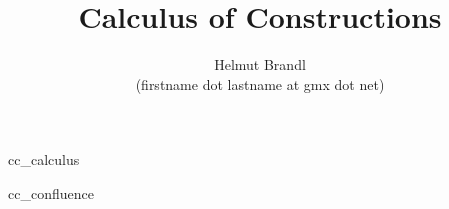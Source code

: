 \documentclass[12pt]{article}
\begin{document}


\title{Calculus of Constructions}
\author{Helmut Brandl \\ \scriptsize (firstname dot lastname at gmx dot net)}
\date{}

\maketitle

\abstract{
}



\tableofcontents

 {cc_calculus}

 {cc_confluence}






\end{document}
